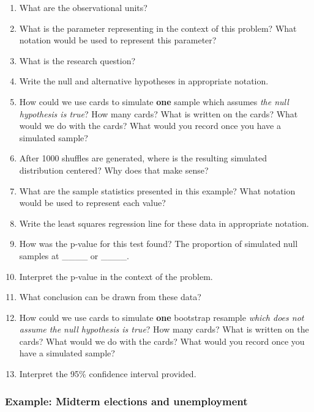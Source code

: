 \documentclass[
]{report}
\newcommand{\rgs}{\vspace{12pt}} %
\begin{document}
\begin{enumerate}
\def\labelenumi{\arabic{enumi}.}
\item
  What are the observational units?
  \rgs
\item
  What is the parameter representing in the context of this problem? What notation would be used to represent this parameter?
  \rgs
  \rgs
\item
  What is the research question?
  \rgs
\item
  Write the null and alternative hypotheses in appropriate notation.
  \rgs
\item
  How could we use cards to simulate \textbf{one} sample which assumes \emph{the null hypothesis is true}? How many cards? What is written on the cards? What would we do with the cards? What would you record once you have a simulated sample?
  \rgs
  \rgs
  \rgs
\item
  After 1000 shuffles are generated, where is the resulting simulated distribution centered? Why does that make sense?
  \rgs
  \rgs
\item
  What are the sample statistics presented in this example? What notation would be used to represent each value?
  \rgs
\item
  Write the least squares regression line for these data in appropriate notation.
  \rgs
\item
  How was the p-value for this test found? The proportion of simulated null samples at \_\_\_\_ or \_\_\_\_.
  \rgs
\item
  Interpret the p-value in the context of the problem.
  \rgs
  \rgs
\item
  What conclusion can be drawn from these data?\\
  \rgs
\item
  How could we use cards to simulate \textbf{one} bootstrap resample \emph{which does not assume the null hypothesis is true}? How many cards? What is written on the cards? What would we do with the cards? What would you record once you have a simulated sample?
  \rgs
  \rgs
  \rgs
\item
  Interpret the 95\% confidence interval provided.
  \rgs
  \rgs
\end{enumerate}

\hypertarget{example-midterm-elections-and-unemployment}{%
\subsubsection*{Example: Midterm elections and unemployment}\label{example-midterm-elections-and-unemployment}}
\end{document}
